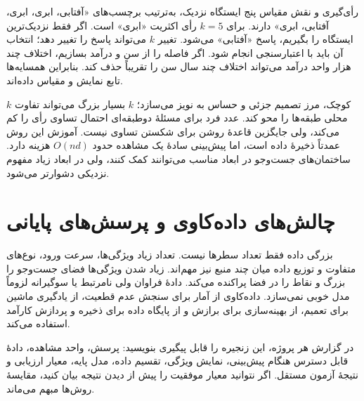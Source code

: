 \begin{example}{رأی‌گیری و نقش مقیاس}
پنج ایستگاه نزدیک، به‌ترتیب برچسب‌های «آفتابی، ابری، ابری، آفتابی، ابری» دارند. برای $k=5$ رأی اکثریت «ابری» است. اگر فقط نزدیک‌ترین ایستگاه را بگیریم، پاسخ «آفتابی» می‌شود. تغییر $k$ می‌تواند پاسخ را تغییر دهد؛ انتخاب آن باید با اعتبارسنجی انجام شود. اگر فاصله را از سن و درآمد بسازیم، اختلاف چند هزار واحد درآمد می‌تواند اختلاف چند سال سن را تقریباً حذف کند. بنابراین همسایه‌ها تابع نمایش و مقیاس داده‌اند.
\end{example}

$k$ کوچک، مرز تصمیم جزئی و حساس به نویز می‌سازد؛ $k$ بسیار بزرگ می‌تواند تفاوت محلی طبقه‌ها را محو کند. عدد فرد برای مسئلهٔ دوطبقه‌ای احتمال تساوی رأی را کم می‌کند، ولی جایگزین قاعدهٔ روشن برای شکستن تساوی نیست. آموزش این روش عمدتاً ذخیرهٔ داده است، اما پیش‌بینی سادهٔ یک مشاهده حدود $O(nd)$ هزینه دارد. ساختمان‌های جست‌وجو در ابعاد مناسب می‌توانند کمک کنند، ولی در ابعاد زیاد مفهوم نزدیکی دشوارتر می‌شود.


\section{چالش‌های داده‌کاوی و پرسش‌های پایانی}
بزرگی داده فقط تعداد سطرها نیست. تعداد زیاد ویژگی‌ها، سرعت ورود، نوع‌های متفاوت و توزیع داده میان چند منبع نیز مهم‌اند. زیاد شدن ویژگی‌ها فضای جست‌وجو را بزرگ و نقاط را در فضا پراکنده می‌کند. دادهٔ فراوان ولی نامرتبط یا سوگیرانه لزوماً مدل خوبی نمی‌سازد. داده‌کاوی از آمار برای سنجش عدم قطعیت، از یادگیری ماشین برای تعمیم، از بهینه‌سازی برای برازش و از پایگاه داده برای ذخیره و پردازش کارآمد استفاده می‌کند.

در گزارش هر پروژه، این زنجیره را قابل پیگیری بنویسید: پرسش، واحد مشاهده، دادهٔ قابل دسترس هنگام پیش‌بینی، نمایش ویژگی، تقسیم داده، مدل پایه، معیار ارزیابی و نتیجهٔ آزمون مستقل. اگر نتوانید معیار موفقیت را پیش از دیدن نتیجه بیان کنید، مقایسهٔ روش‌ها مبهم می‌ماند.
